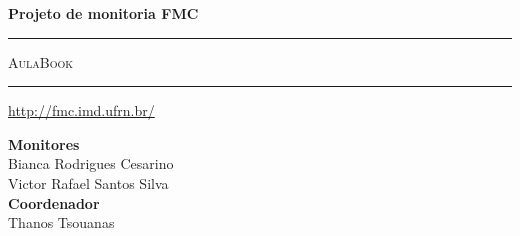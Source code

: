 \thispagestyle{empty}
\begin{center}
\Large
\parindent=0pt

\begin{flushright}
\ttfamily
\compiletime
\end{flushright}

\vspace{\stretch1}

{\bfseries\huge Projeto de monitoria FMC}

\vspace{5mm}

\rule{\textwidth}{2mm}

\vspace{1cm}

{\scshape\Huge AulaBook}

\vspace{1cm}

\rule{\textwidth}{2mm}

\vspace{5mm}

\url{http://fmc.imd.ufrn.br/}

\vspace{1cm}

\vspace{\stretch1}

\begin{center}
{\bfseries\sffamily Monitores}\\
Bianca Rodrigues Cesarino\\
Victor Rafael Santos Silva\\[1.5em]
{\bfseries\sffamily Coordenador}\\
Thanos Tsouanas\\
\end{center}

\vspace{\stretch1}

\end{center}
